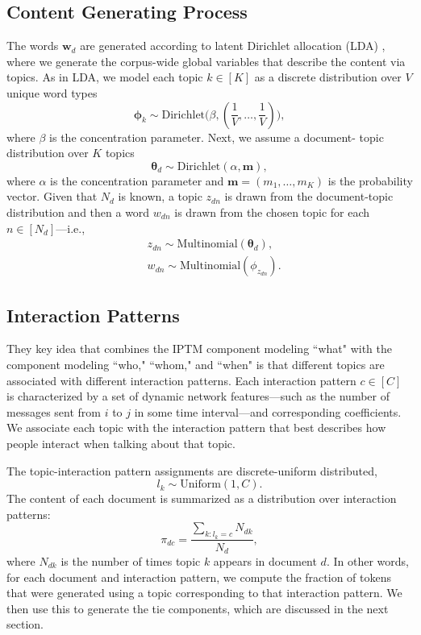 \documentclass{article}
\begin{document}
\subsection{Content Generating Process}\label{subsec:Content generating process}

The words $\boldsymbol{w}_d$ are generated according to latent Dirichlet allocation (LDA) \cite{Blei2003}, where we generate the corpus-wide global variables that describe the content via topics. As in LDA, we model each topic $k\in [K]$ as a discrete distribution over $V$ unique word types 
\begin{equation}
\boldsymbol{\phi}_k \sim \mbox{Dirichlet}\Big(\beta, (\frac{1}{V},\ldots,\frac{1}{V})\Big),
\end{equation}
where $\beta$ is the concentration parameter. Next, we assume a document- topic distribution over $K$ topics\\
\begin{equation}
\boldsymbol{\theta}_d \sim \mbox{Dirichlet}(\alpha, \boldsymbol{m}),
\end{equation}
where $\alpha$ is the concentration parameter and $\boldsymbol{m}=(m_1,\ldots,m_K)$ is the probability vector. Given that $N_d$ is known, a topic $z_{dn}$ is drawn from the document-topic distribution and then a word $w_{dn}$ is drawn from the chosen topic for each $n \in [N_d]$---i.e.,
\begin{equation}
\begin{aligned}
&z_{dn} \sim \mbox{Multinomial}(\boldsymbol{\theta}_d),\\
&w_{dn} \sim\mbox{Multinomial} (\phi_{z_{dn}}).
\end{aligned}
\end{equation}
\subsection{Interaction Patterns}\label{subsec:Interaction patterns}
They key idea that combines the IPTM component modeling ``what" with
the component modeling ``who," ``whom," and ``when" is that different
topics are associated with different interaction patterns.  Each interaction pattern $c \in [C]$ is characterized by a set of dynamic network features---such as the number of messages sent from $i$ to $j$ in some time interval---and corresponding coefficients. We associate each topic with the interaction pattern that best describes how people interact when talking about that topic. 

The topic-interaction pattern assignments are discrete-uniform distributed,
\begin{equation}
l_k\sim \mbox{Uniform}(1, C).
\end{equation}
The content of each document is summarized as a distribution
over interaction patterns:
\begin{equation}
\pi_{dc} = \frac{\sum_{k:l_k=c}N_{dk}}{N_d},
\end{equation}
where $N_{dk}$ is the number of times topic $k$ appears in document $d$. In other words, for each document and interaction pattern, we compute the fraction of tokens that were generated using a topic corresponding to that interaction
pattern. We then use this to generate the tie components, which are discussed in the next section.
\end{document}
